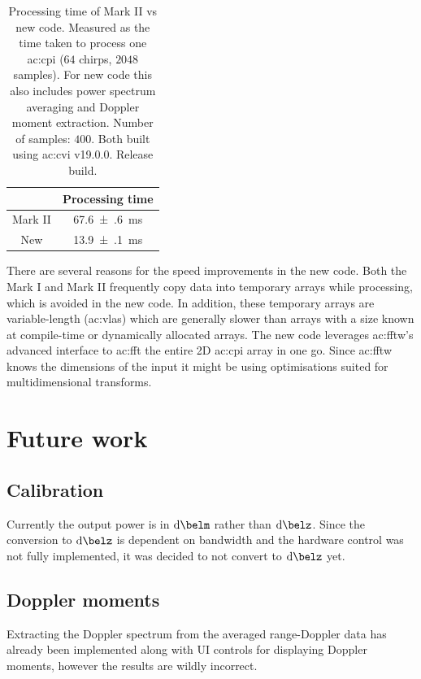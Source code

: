 \documentclass{article}
\begin{document}
\begin{table}[H]
	\centering
	\begin{tabular}{|c|c|}
		\hline
		        & Processing time             \\
		\hline
		Mark II & \SI{67.6(6)}{\milli\second} \\
		\hline
		New     & \SI{13.9(1)}{\milli\second} \\
		\hline
	\end{tabular}
	\caption{Processing time of Mark II vs new code. Measured as the time taken to process one \acrshort{ac:cpi} (\(64\) chirps, \(2048\) samples). For new code this also includes power spectrum averaging and Doppler moment extraction. Number of samples: \(400\). Both built using \acrshort{ac:cvi} v19.0.0. Release build.}
	\label{tbl:ProcTime}
\end{table}

There are several reasons for the speed improvements in the new code.
Both the Mark I and Mark II frequently copy data into temporary arrays while processing, which is avoided in the new code.
In addition, these temporary arrays are variable-length (\acrshort{ac:vla}s) which are generally slower than arrays with a size known at compile-time or dynamically allocated arrays.
The new code leverages \acrshort{ac:fftw}'s advanced interface to \acrshort{ac:fft} the entire 2D \acrshort{ac:cpi} array in one go. Since \acrshort{ac:fftw} knows the dimensions of the input it might be using optimisations suited for multidimensional transforms.

\section{Future work}
\subsection{Calibration}
Currently the output power is in \(\si{\deci\belm}\) rather than \(\si{\deci\belz}\). Since the conversion to \(\si{\deci\belz}\) is dependent on bandwidth and the hardware control was not fully implemented, it was decided to not convert to \(\si{\deci\belz}\) yet.

\subsection{Doppler moments}
Extracting the Doppler spectrum from the averaged range-Doppler data has already been implemented along with UI controls for displaying Doppler moments, however the results are wildly incorrect. 
\end{document}
